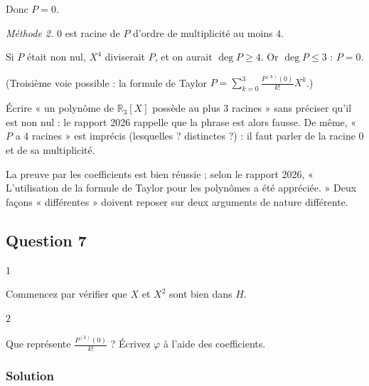 \documentclass[11pt,a4paper]{article}
\begin{document}
Donc \(P=0\).

\emph{Méthode 2.} \(0\) est racine de \(P\) d'ordre de multiplicité au moins \(4\).

Si \(P\) était non nul, \(X^4\) diviserait \(P\), et on aurait \(\deg P\geqslant4\). Or \(\deg P\leqslant3\) : \textbf{\(P=0\)}.

(Troisième voie possible : la formule de Taylor \(P=\sum_{k=0}^{3}\frac{P^{(k)}(0)}{k!}X^k\).)

\begin{piege}

Écrire « un polynôme de \({\mathbb{R}}_3[X]\) possède au plus 3 racines » sans préciser qu'il est non nul : le rapport 2026 rappelle que la phrase est alors fausse. De même, « \(P\) a 4 racines » est imprécis (lesquelles ? distinctes ?) : il faut parler de la racine \(0\) et de sa multiplicité.

\end{piege}

\begin{jury}

La preuve par les coefficients est bien réussie ; selon le rapport 2026, « L'utilisation de la formule de Taylor pour les polynômes a été appréciée. » Deux façons « différentes » doivent reposer sur deux arguments de nature différente.

\end{jury}

\hypertarget{question-7}{%
\subsection{Question 7}\label{question-7}}

\begin{indication}{1}

Commencez par vérifier que \(X\) et \(X^2\) sont bien dans \(H\).

\end{indication}

\begin{indication}{2}

Que représente \(\frac{P^{(k)}(0)}{k!}\) ? Écrivez \(\varphi\) à l'aide des coefficients.

\end{indication}

\hypertarget{solution-6}{%
\subsubsection{Solution}\label{solution-6}}
\end{document}
